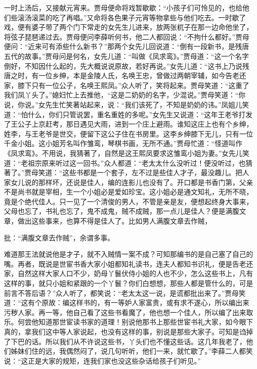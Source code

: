 \begin{parag}


    一时上汤后，又接献元宵来。贾母便命将戏暂歇歇：“小孩子们可怜见的，也给他们些滚汤滚菜的吃了再唱。”又命将各色果子元宵等物拿些与他们吃去。一时歇了戏，便有婆子带了两个门下常走的女先生儿进来，放两张杌子在那一边命他坐了，将弦子琵琶递过去。贾母便问李薛听何书，他二人都回说：“不拘什么都好。”贾母便问：“近来可有添些什么新书？”那两个女先儿回说道：“倒有一段新书，是残唐五代的故事。”贾母问是何名，女先儿道：“叫做《凤求鸾》。”贾母道：“这一个名字倒好，不知因什么起的，先大概说说原故，若好再说。”女先儿道：“这书上乃说残唐之时，有一位乡绅，本是金陵人氏，名唤王忠，曾做过两朝宰辅，如今告老还家，膝下只有一位公子，名唤王熙凤。”众人听了，笑将起来。贾母笑道：“这重了我们凤丫头了。”媳妇忙上去推他，“这是二奶奶的名字，少混说。”贾母笑道：“你说，你说。”女先生忙笑著站起来，说：“我们该死了，不知是奶奶的讳。”凤姐儿笑道：“怕什么，你们只管说罢，重名重姓的多呢。”女先生又说道：“这年王老爷打发了王公子上京赶考，那日遇见大雨，进到一个庄上避雨。谁知这庄上也有个乡绅，姓李，与王老爷是世交，便留下这公子住在书房里。这李乡绅膝下无儿，只有一位千金小姐。这小姐芳名叫作雏鸾，琴棋书画，无所不通。”贾母忙道：“怪道叫作《凤求鸾》。不用说，我猜著了，自然是这王熙凤要求这雏鸾小姐为妻。”女先儿笑道：“老祖宗原来听过这一回书。”众人都道：“老太太什么没听过！便没听过，也猜著了。”贾母笑道：“这些书都是一个套子，左不过是些佳人才子，最没趣儿。把人家女儿说的那样坏，还说是佳人，编的连影儿也没有了。开口都是书香门第，父亲不是尚书就是宰相，生一个小姐必是爱如珍宝。这小姐必是通文知礼，无所不晓，竟是个绝代佳人。只一见了一个清俊的男人，不管是亲是友，便想起终身大事来，父母也忘了，书礼也忘了，鬼不成鬼，贼不成贼，那一点儿是佳人？便是满腹文章，做出这些事来，也算不得是佳人了。比如男人满腹文章去作贼，\begin{note}批：“满腹文章去作贼”，余谓多事。\end{note}难道那王法就说他是才子，就不入贼情一案不成？可知那编书的是自己塞了自己的嘴。再者，既说是世宦书香大家小姐都知礼读书，连夫人都知书识礼，便是告老还家，自然这样大家人口不少，奶母丫鬟伏侍小姐的人也不少，怎么这些书上，凡有这样的事，就只小姐和紧跟的一个丫鬟？你们白想想，那些人都是管什么的，可是前言不答后语？”众人听了，都笑说：“老太太这一说，是谎都批出来了。”贾母笑道：“这有个原故：编这样书的，有一等妒人家富贵，或有求不遂心，所以编出来污秽人家。再一等，他自己看了这些书看魔了，他也想一个佳人，所以编了出来取乐。何尝他知道那世宦读书家的道理！别说他那书上那些世宦书礼大家，如今眼下真的，拿我们这中等人家说起，也没有这样的事，别说是那些大家子。可知是诌掉了下巴的话。所以我们从不许说这些书，丫头们也不懂这些话。这几年我老了，他们姊妹们住的远，我偶然闷了，说几句听听，他们一来，就忙歇了。”李薛二人都笑说：“这正是大家的规矩，连我们家也没这些杂话给孩子们听见。”
\end{parag}


